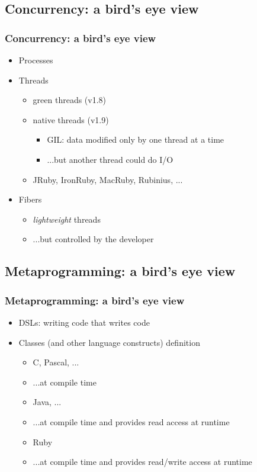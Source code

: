 \subsection{Concurrency: a bird's eye view}
\begin{frame}\frametitle{Concurrency: a bird's eye view}

\begin{itemize}[<+->]

\item Processes

\item Threads
\begin{itemize}

\item green threads (v1.8)
\item native threads (v1.9)
\begin{itemize}
\item GIL: data modified only by one thread at a time
\item ...but another thread could do I/O
\end{itemize}
\item JRuby, IronRuby, MacRuby, Rubinius, ...
\end{itemize}

\item Fibers
\begin{itemize}
\item \emph{lightweight} threads
\item ...but controlled by the developer
\end{itemize}

\end{itemize}

\end{frame}



\subsection{Metaprogramming: a bird's eye view} 
\begin{frame}\frametitle{Metaprogramming: a bird's eye view} 
\begin{itemize}[<+->]

\item DSLs: writing code that writes code

\item Classes (and other language constructs) definition
\begin{itemize}
\item C, Pascal, ...
\item ...at compile time
\item Java, ...
\item ...at compile time and provides read access at runtime
\item Ruby
\item ...at compile time and provides read/write access at runtime
\end{itemize}

\end{itemize}
\end{frame}
